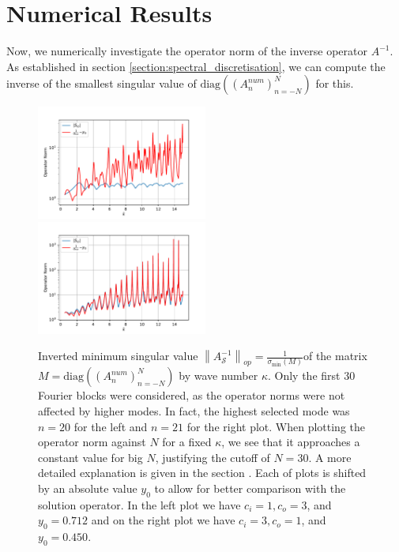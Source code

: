 \documentclass[12pt,journal,compsoc, onecolumn]{IEEEtran}
\begin{document}
\section{Numerical Results} 
\label{section:numerical_results}
Now, we numerically investigate the operator norm of the inverse operator $A^{-1}$. As established in section \ref{section:spectral_discretisation}, we can compute the inverse of the smallest singular value of $\mathrm{diag}((A_n^{num})_{n = -N}^N)$ for this.
\begin{figure}
    \includegraphics[width=0.5\textwidth]{InvertedMinimumSingularValuec_i1,0c_o3,0N_30eta1,0plotRangeStart_0,5plotRangeEnd_15indexrange_-20,0-0,0_y_0_0,7115197817684848.pdf}
    \includegraphics[width=0.5\textwidth]{InvertedMinimumSingularValuec_i3,0c_o1,0N_30eta1,0plotRangeStart_0,5plotRangeEnd_15indexrange_-21,0-0,0_y_0_0,4499662913189779.pdf}
    \caption{Inverted minimum singular value $\left\|A_{\mathcal{S}}^{-1}\right\|_{o p} =\frac{1}{\sigma_{\min }(M)}$of the matrix $M = \mathrm{diag}((A_n^{num})_{n = -N}^N)$ by wave number $\kappa$. Only the first 30 Fourier blocks were considered, as the operator norms were not affected by higher modes. In fact, the highest selected mode was $n = 20$ for the left and $n =21$ for the right plot.
    When plotting the operator norm against $N$ for a fixed $\kappa$, we see that it approaches a constant value for big $N$, justifying the cutoff of $N = 30$. A more detailed explanation is given in the section .
    Each of plots is shifted by an absolute value $y_0$ to allow for better comparison with the solution operator.
    In the left plot we have $c_i = 1, c_o = 3$, and $y_0 = 0.712$
    and on the right plot we have $c_i = 3, c_o = 1$, and $y_0 = 0.450$. }
   \label{fig:simulation_results}
\end{figure}
\end{document}
